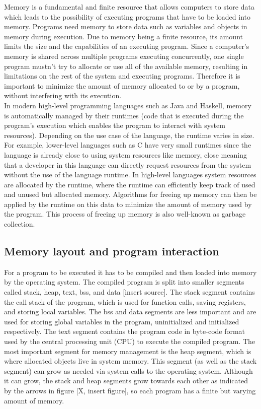 Memory is a fundamental and finite resource that allows computers to store data which leads to the possibility
of executing programs that have to be loaded into memory. Programs need memory to store data such as variables
and objects in memory during execution. Due to memory being a finite resource, its amount limits the size and
the capabilities of an executing program. Since a computer's memory is shared across multiple programs
executing concurrently, one single program mustn't try to allocate or use all of the
available memory, resulting in limitations on the rest of the system and executing programs. Therefore
it is important to minimize the amount of memory allocated to or by a program, without
interfering with its execution.\\

In modern high-level programming languages such as Java and Haskell, memory is automatically managed by
their runtimes (code that is executed during the program's execution which enables the program to interact
with system resources). Depending on the use case of the language, the runtime varies in size. For example, lower-level
languages such as C have very small runtimes since the language is already close to using system resources like
memory, close meaning that a developer in this language can directly request resources from the system
without the use of the language runtime. In high-level languages system resources are allocated by
the runtime, where the runtime can efficiently keep track of used and unused but allocated memory.
Algorithms for freeing up memory can then be applied by the runtime on this data to minimize the amount
of memory used by the program. This process of freeing up memory is also well-known as garbage collection.\\

\subsection{Memory layout and program interaction}

For a program to be executed it has to be compiled and then loaded into memory by the operating system.
The compiled program is split into smaller segments called stack, heap, text, bss, and data [insert source].
The stack segment contains the call stack of the program, which is used for function calls, saving registers,
and storing local variables. The bss and data segments are less important and are used for storing
global variables in the program, uninitialized and initialized respectively. The text segment
contains the program code in byte-code format used by the central processing unit (CPU) to execute the
compiled program. The most important segment for memory management is the heap segment, which is where allocated
objects live in system memory. This segment (as well as the stack segment) can grow as needed via system
calls to the operating system. Although it can grow, the stack and heap segments grow towards each other
as indicated by the arrows in figure [X, insert figure], so each program has a finite but varying amount of memory.\\ %

